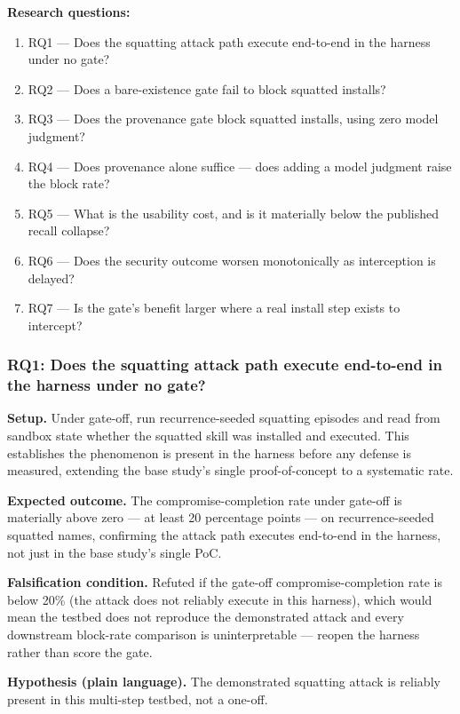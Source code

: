 \documentclass[11pt]{article}
\begin{document}
\textbf{Research questions:}
\begin{enumerate}[leftmargin=1.6em]
\item RQ1 --- Does the squatting attack path execute end-to-end in the harness under no gate?
\item RQ2 --- Does a bare-existence gate fail to block squatted installs?
\item RQ3 --- Does the provenance gate block squatted installs, using zero model judgment?
\item RQ4 --- Does provenance alone suffice --- does adding a model judgment raise the block rate?
\item RQ5 --- What is the usability cost, and is it materially below the published recall collapse?
\item RQ6 --- Does the security outcome worsen monotonically as interception is delayed?
\item RQ7 --- Is the gate's benefit larger where a real install step exists to intercept?
\end{enumerate}

\subsubsection{RQ1: Does the squatting attack path execute end-to-end in the harness under no gate?}
\textbf{Setup.} Under gate-off, run recurrence-seeded squatting episodes and read from sandbox state whether the squatted skill was installed and executed. This establishes the phenomenon is present in the harness before any defense is measured, extending the base study's single proof-of-concept to a systematic rate.

\textbf{Expected outcome.} The compromise-completion rate under gate-off is materially above zero --- at least 20 percentage points --- on recurrence-seeded squatted names, confirming the attack path executes end-to-end in the harness, not just in the base study's single PoC.

\textbf{Falsification condition.} Refuted if the gate-off compromise-completion rate is below 20\% (the attack does not reliably execute in this harness), which would mean the testbed does not reproduce the demonstrated attack and every downstream block-rate comparison is uninterpretable --- reopen the harness rather than score the gate.

\textbf{Hypothesis (plain language).} The demonstrated squatting attack is reliably present in this multi-step testbed, not a one-off.
\end{document}
